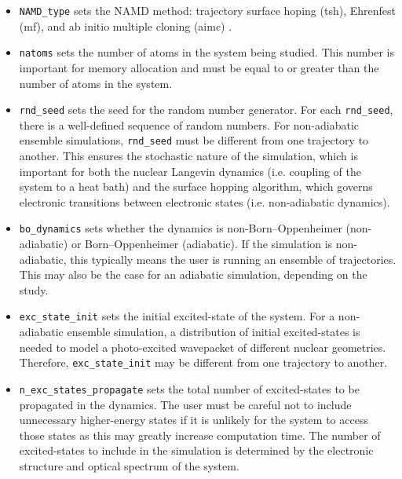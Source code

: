 \begin{itemize}
\item \verb+NAMD_type+ sets the NAMD method: trajectory surface hoping (tsh), Ehrenfest (mf), and ab initio multiple cloning (aimc) \cite{freixas2018ab,freixas2021nonadiabatic}.
\item \verb+natoms+ sets the number of atoms in the system being studied.  This number is important for memory allocation and must be equal to or greater than the number of atoms in the system.
\item \verb+rnd_seed+ sets the seed for the random number generator.  For each \verb+rnd_seed+, there is a well-defined sequence of random numbers.  For non-adiabatic ensemble simulations, \verb+rnd_seed+ must be different from one trajectory to another.  This ensures the stochastic nature of the simulation, which is important for both the nuclear Langevin dynamics (i.e. coupling of the system to a heat bath) and the surface hopping algorithm,\cite{tully1990molecular} which governs electronic transitions between electronic states (i.e. non-adiabatic dynamics).%
\item \verb+bo_dynamics+ sets whether the dynamics is non-Born--Oppenheimer (non-adiabatic) or Born--Oppenheimer (adiabatic).  If the simulation is non-adiabatic, this typically means the user is running an ensemble of trajectories.  This may also be the case for an adiabatic simulation, depending on the study.
\item \verb+exc_state_init+ sets the initial excited-state of the system.  For a non-adiabatic ensemble simulation, a distribution of initial excited-states is needed to model a photo-excited wavepacket of different nuclear geometries.  Therefore, \verb+exc_state_init+ may be different from one trajectory to another.%
\item \verb+n_exc_states_propagate+ sets the total number of excited-states to be propagated in the dynamics.  The user must be careful not to include unnecessary higher-energy states if it is unlikely for the system to access those states as this may greatly increase computation time. The number of excited-states to include in the simulation is determined by the electronic structure and optical spectrum of the system.%
\end{itemize}

